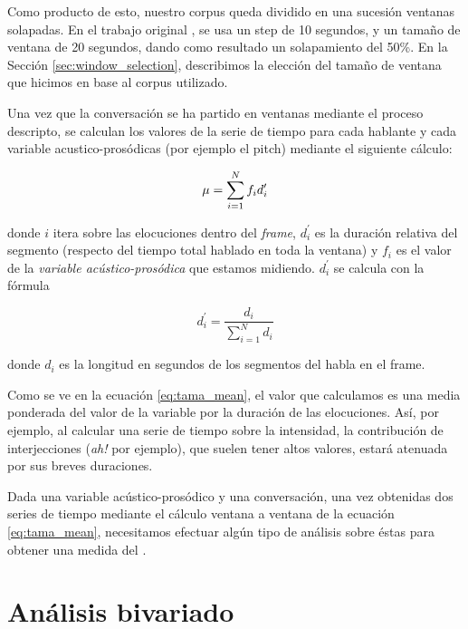 Como producto de esto, nuestro corpus queda dividido en una sucesión ventanas solapadas. En el trabajo original \cite{KOU2008}, se usa un step de 10 segundos, y un tamaño de ventana de 20 segundos, dando como resultado un solapamiento del 50\%. En la Sección \ref{sec:window_selection}, describimos la elección del tamaño de ventana que hicimos en base al corpus utilizado.


Una vez que la conversación se ha partido en ventanas mediante el proceso descripto, se calculan los valores de la serie de tiempo para cada hablante y cada variable acustico-prosódicas (por ejemplo el pitch) mediante el siguiente cálculo:

\begin{equation}
    \mu = \sum\limits_{i=1}^N f_i d_i^\prime \label{eq:tama_mean}\\
\end{equation}

\noindent donde $i$ itera sobre las elocuciones dentro del \emph{frame}, $d_i^\prime$ es la duración relativa del segmento (respecto del tiempo total hablado en toda la ventana) y $f_i$ es el valor de la \emph{variable acústico-prosódica} que estamos midiendo. $d_i^\prime$ se calcula con la fórmula

\begin{equation}
d_i^\prime = \frac{d_i}{\sum\limits_{i=1}^N d_i}
\end{equation}

\noindent donde $d_i$ es la longitud en segundos de los segmentos del habla en el frame.

Como se ve en la ecuación \ref{eq:tama_mean}, el valor que calculamos es una media ponderada del valor de la variable por la duración de las elocuciones. Así, por ejemplo, al calcular una serie de tiempo sobre la intensidad, la contribución de interjecciones (\emph{ah!} por ejemplo), que suelen tener altos valores, estará atenuada por sus breves duraciones.

Dada una variable acústico-prosódico y una conversación, una vez obtenidas  dos series de tiempo mediante el cálculo ventana a ventana de la ecuación \ref{eq:tama_mean}, necesitamos efectuar algún tipo de análisis sobre éstas para obtener una medida del \entrainment.


\section{Análisis bivariado}
\label{sec:analisis_bivariado}

